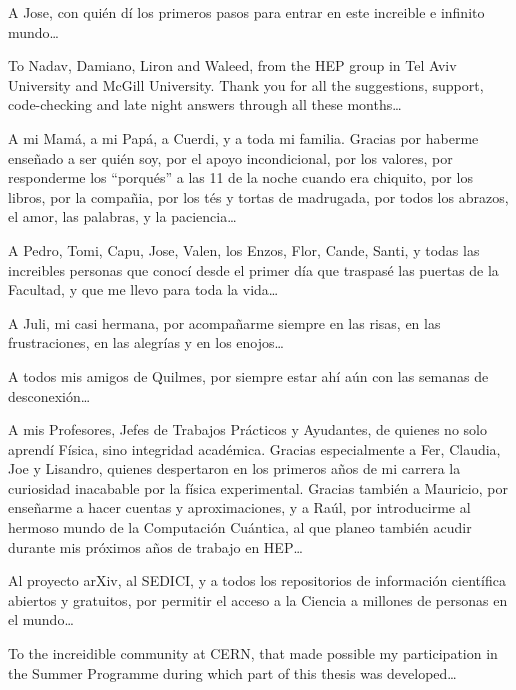 {    A Jose, con quién dí los primeros pasos para entrar en este increible e infinito mundo\dots

    To Nadav, Damiano, Liron and Waleed, from the HEP group in Tel Aviv University and McGill University. Thank you for all the suggestions, support, code-checking and late night answers through all these months\dots

    A mi Mamá, a mi Papá, a Cuerdi, y a toda mi familia. Gracias por haberme enseñado a ser quién soy, por el apoyo incondicional, por los valores, por responderme los ``porqués'' a las 11 de la noche cuando era chiquito, por los libros, por la compañia, por los tés y tortas de madrugada, por todos los abrazos, el amor, las palabras, y la paciencia\dots

    A Pedro, Tomi, Capu, Jose, Valen, los Enzos, Flor, Cande, Santi, y todas las increibles personas que conocí desde el primer día que traspasé las puertas de la Facultad, y que me llevo para toda la vida\dots

    A Juli, mi casi hermana, por acompañarme siempre en las risas, en las frustraciones, en las alegrías y en los enojos\dots

    A todos mis amigos de Quilmes, por siempre estar ahí aún con las semanas de desconexión\dots

    A mis Profesores, Jefes de Trabajos Prácticos y Ayudantes, de quienes no solo aprendí Física, sino integridad académica. Gracias especialmente a Fer, Claudia, Joe y Lisandro, quienes despertaron en los primeros años de mi carrera la curiosidad inacabable por la física experimental. Gracias también a Mauricio, por enseñarme a hacer cuentas y aproximaciones, y a Raúl, por introducirme al hermoso mundo de la Computación Cuántica, al que planeo también acudir durante mis próximos años de trabajo en HEP\dots

    Al proyecto arXiv, al SEDICI, y a todos los repositorios de información científica abiertos y gratuitos, por permitir el acceso a la Ciencia a millones de personas en el mundo\dots

    To the increidible community at CERN, that made possible my participation in the Summer Programme during which part of this thesis was developed\dots
}

\cleardoublepage{}
